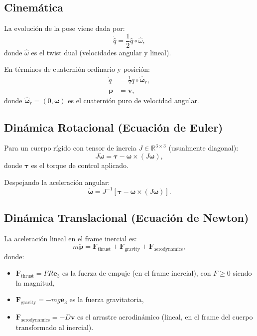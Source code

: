 \documentclass[11pt,a4paper]{article}
\begin{document}
\subsection{Cinemática}

La evolución de la pose viene dada por:
\begin{equation}
    \dot{\hat{q}} = \frac{1}{2} \hat{q} \circ \hat{\omega},
    \label{eq:pose_kinematics}
\end{equation}
donde $\hat{\omega}$ es el twist dual (velocidades angular y lineal).

En términos de cuaternión ordinario y posición:
\begin{align}
    \dot{q} &= \frac{1}{2} q \circ \hat{\boldsymbol{\omega}}_r, \\
    \dot{\mathbf{p}} &= \mathbf{v},
\end{align}
donde $\hat{\boldsymbol{\omega}}_r = (0, \boldsymbol{\omega})$ es el cuaternión puro de velocidad angular.

\subsection{Dinámica Rotacional (Ecuación de Euler)}

Para un cuerpo rígido con tensor de inercia $J \in \mathbb{R}^{3 \times 3}$ (usualmente diagonal):
\begin{equation}
    J \dot{\boldsymbol{\omega}} = \boldsymbol{\tau} - \boldsymbol{\omega} \times (J \boldsymbol{\omega}),
    \label{eq:euler_equation}
\end{equation}
donde $\boldsymbol{\tau}$ es el torque de control aplicado.

Despejando la aceleración angular:
\begin{equation}
    \dot{\boldsymbol{\omega}} = J^{-1} [\boldsymbol{\tau} - \boldsymbol{\omega} \times (J \boldsymbol{\omega})].
\end{equation}

\subsection{Dinámica Translacional (Ecuación de Newton)}

La aceleración lineal en el frame inercial es:
\begin{equation}
    m \ddot{\mathbf{p}} = \mathbf{F}_{\text{thrust}} + \mathbf{F}_{\text{gravity}} + \mathbf{F}_{\text{aerodynamics}},
\end{equation}
donde:
\begin{itemize}
    \item $\mathbf{F}_{\text{thrust}} = F R \mathbf{e}_3$ es la fuerza de empuje (en el frame inercial), con $F \geq 0$ siendo la magnitud,
    \item $\mathbf{F}_{\text{gravity}} = -mg\mathbf{e}_3$ es la fuerza gravitatoria,
    \item $\mathbf{F}_{\text{aerodynamics}} = -D \mathbf{v}$ es el arrastre aerodinámico (lineal, en el frame del cuerpo transformado al inercial).
\end{itemize}
\end{document}
